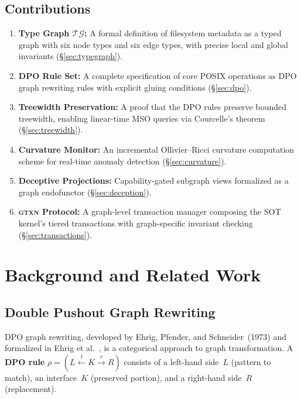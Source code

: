\documentclass[11pt,a4paper]{article}
\theoremstyle{definition}
\newcommand{\TG}{\ensuremath{\mathcal{TG}}}
\newcommand{\GTXN}{\textsc{gtxn}}
\begin{document}
\subsection{Contributions}

\begin{enumerate}[nosep]
  \item \textbf{Type Graph \TG:} A formal definition of filesystem metadata
    as a typed graph with six node types and six edge types, with precise
    local and global invariants (\S\ref{sec:typegraph}).
  \item \textbf{DPO Rule Set:} A complete specification of core POSIX
    operations as DPO graph rewriting rules with explicit gluing conditions
    (\S\ref{sec:dpo}).
  \item \textbf{Treewidth Preservation:} A proof that the DPO rules preserve
    bounded treewidth, enabling linear-time MSO queries via Courcelle's
    theorem (\S\ref{sec:treewidth}).
  \item \textbf{Curvature Monitor:} An incremental Ollivier--Ricci curvature
    computation scheme for real-time anomaly detection (\S\ref{sec:curvature}).
  \item \textbf{Deceptive Projections:} Capability-gated subgraph views
    formalized as a graph endofunctor (\S\ref{sec:deception}).
  \item \textbf{\GTXN{} Protocol:} A graph-level transaction manager composing
    the SOT kernel's tiered transactions with graph-specific invariant
    checking (\S\ref{sec:transactions}).
\end{enumerate}

\section{Background and Related Work}

\subsection{Double Pushout Graph Rewriting}

DPO graph rewriting, developed by Ehrig, Pfender, and Schneider~(1973) and
formalized in Ehrig et al.~\cite{ehrig2006}, is a categorical approach to
graph transformation. A \textbf{DPO rule} $\rho = (L \xleftarrow{l} K
\xrightarrow{r} R)$ consists of a left-hand side~$L$ (pattern to match),
an interface~$K$ (preserved portion), and a right-hand side~$R$ (replacement).
\end{document}
